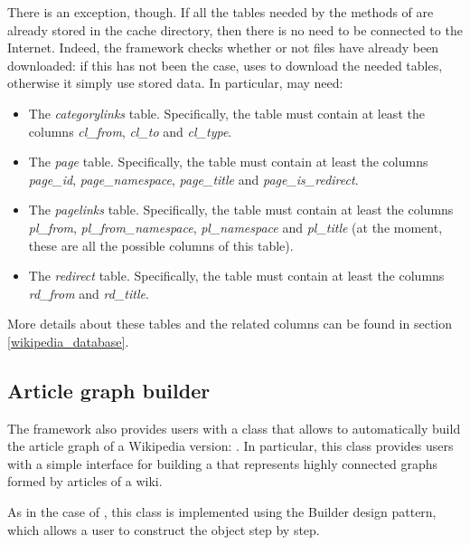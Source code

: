                 There is an exception, though. If all the tables needed by the methods of  are already stored in the cache directory, then there is no need to be connected to the Internet. Indeed, the framework checks whether or not files have already been downloaded: if this has not been the case,  uses  to download the needed tables, otherwise it simply use stored data. In particular,  may need:
                \begin{itemize}
                    \item The \emph{categorylinks} table. Specifically, the table must contain at least the columns \emph{cl\_from}, \emph{cl\_to} and \emph{cl\_type}.
                    \item The \emph{page} table. Specifically, the table must contain at least the columns \emph{page\_id}, \emph{page\_namespace}, \emph{page\_title} and \emph{page\_is\_redirect}.
                    \item The \emph{pagelinks} table. Specifically, the table must contain at least the columns \emph{pl\_from}, \emph{pl\_from\_namespace}, \emph{pl\_namespace} and \emph{pl\_title} (at the moment, these are all the possible columns of this table).
                    \item The \emph{redirect} table. Specifically, the table must contain at least the columns \emph{rd\_from} and \emph{rd\_title}.
                \end{itemize}
                More details about these tables and the related columns can be found in section \ref{wikipedia_database}.
        \subsection{Article graph builder}\label{articlegraphbuilder}
            The framework also provides users with a class that allows to automatically build the article graph of a Wikipedia version: . In particular, this class provides users with a simple interface for building a   that represents highly connected graphs formed by articles of a wiki.
            
            As in the case of , this class is implemented using the Builder design pattern, which allows a user to construct the object step by step.
            
